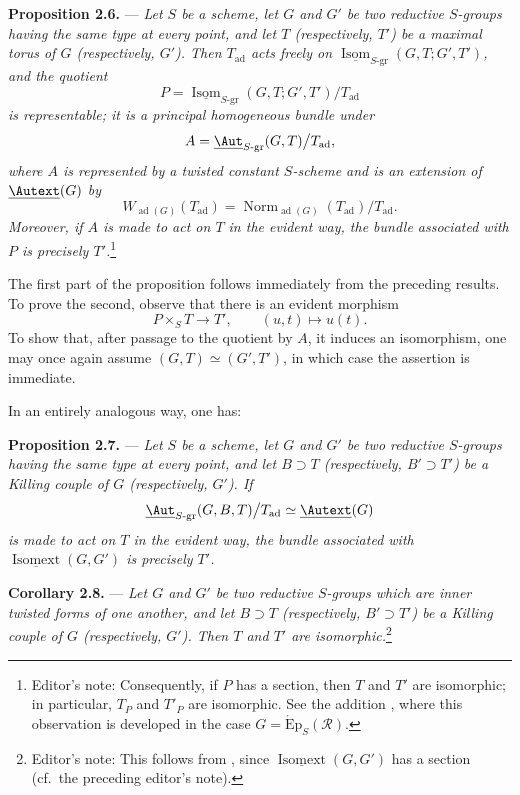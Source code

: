 \medskip\noindent\textbf{Proposition 2.6.} ---
{\itshape Let \(S\) be a scheme, let \(G\) and \(G'\) be two reductive
\(S\)-groups having the same type at every point, and let \(T\)
(respectively, \(T'\)) be a maximal torus of \(G\) (respectively,
\(G'\)). Then \(T_{\mathrm{ad}}\) acts freely on
\(\underline{\operatorname{Isom}}_{S\text{-}\mathrm{gr}}
(G,T;G',T')\), and the quotient}
\[
  P=
  \underline{\operatorname{Isom}}_{S\text{-}\mathrm{gr}}
    (G,T;G',T')
  \big/T_{\mathrm{ad}}
\]
{\itshape is representable; it is a principal homogeneous bundle under}
\[
  A=
  \underline{\Aut}_{S\text{-}\mathrm{gr}}(G,T)
  \big/T_{\mathrm{ad}},
\]
{\itshape where \(A\) is represented by a twisted constant \(S\)-scheme
and is an extension of \(\underline{\Autext}(G)\) by}
\[
  W_{\operatorname{ad}(G)}(T_{\mathrm{ad}})
  =
  \operatorname{Norm}_{\operatorname{ad}(G)}(T_{\mathrm{ad}})
  \big/T_{\mathrm{ad}}.
\]
{\itshape Moreover, if \(A\) is made to act on \(T\) in the evident
way, the bundle associated with \(P\) is precisely \(T'\).}\footnote{Editor's
note: Consequently, if \(P\) has a section, then \(T\) and \(T'\)
are isomorphic; in particular, \(T_P\) and \(T'_P\) are isomorphic.
See the addition , where this observation is developed in the
case \(G=\operatorname{\acute{E}p}_S(\mathscr R)\).}

The first part of the proposition follows immediately from the
preceding results. To prove the second, observe that there is an
evident morphism
\[
  P\times_S T\longrightarrow T',
  \qquad (u,t)\longmapsto u(t).
\]
To show that, after passage to the quotient by \(A\), it induces an
isomorphism, one may once again assume
\((G,T)\simeq(G',T')\), in which case the assertion is immediate.

In an entirely analogous way, one has:

\medskip\noindent\textbf{Proposition 2.7.} ---
{\itshape Let \(S\) be a scheme, let \(G\) and \(G'\) be two reductive
\(S\)-groups having the same type at every point, and let
\(B\supset T\) (respectively, \(B'\supset T'\)) be a Killing couple
of \(G\) (respectively, \(G'\)). If
\[
  \underline{\Aut}_{S\text{-}\mathrm{gr}}(G,B,T)
  \big/T_{\mathrm{ad}}
  \simeq \underline{\Autext}(G)
\]
is made to act on \(T\) in the evident way, the bundle associated
with \(\underline{\operatorname{Isomext}}(G,G')\) is precisely
\(T'\).}

\medskip\noindent\textbf{Corollary 2.8.} ---
{\itshape Let \(G\) and \(G'\) be two reductive \(S\)-groups which are
inner twisted forms of one another, and let \(B\supset T\)
(respectively, \(B'\supset T'\)) be a Killing couple of \(G\)
(respectively, \(G'\)). Then \(T\) and \(T'\) are
isomorphic.}\footnote{Editor's note: This follows from , since
\(\underline{\operatorname{Isomext}}(G,G')\) has a section
(cf.\ the preceding editor's note).}


